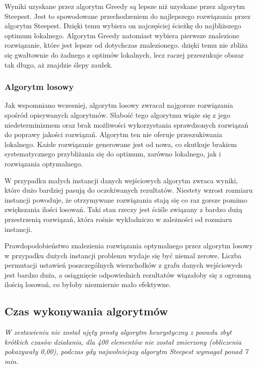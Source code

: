 Wyniki uzyskane przez algorytm Greedy są lepsze niż uzyskane przez algorytm Steepest. 
Jest to spowodowane przechodzeniem do najlepszego rozwiązania przez algorytm Steepest. 
Dzięki temu wybiera on najczęściej ścieżkę do najbliższego optimum lokalnego. Algorytm
Greedy natomiast wybiera pierwsze znalezione rozwiązanie, które jest lepsze od dotychczas 
znalezionego. dzięki temu nie zbliża się gwałtownie do żadnego z optimów lokalnych, lecz 
raczej przeszukuje obszar tak długo, aż znajdzie ślepy zaułek.


\subsubsection{Algorytm losowy}

Jak wspomniano wczesniej, algorytm losowy zwracał najgorsze rozwiązania spośród
opisywanych algorytmów. Słabość tego algorytmu wiąże się z jego niedeterminizmem
oraz brak możliwości wykorzystania sprawdzonych rozwiązań do poprawy jakości
rozwiązań. Algorytm ten nie oferuje przeszukiwania lokalnego. Każde rozwiązanie
generowane jest od nowa, co skutkuje brakiem systematycznego przybliżania
się do optimum, zarówno lokalnego, jak i rozwiązania optymalnego.

W przypadku małych instancji danych wejściowych algorytm zwraca wyniki, które
dużo bardziej pasują do oczekiwanych rezultatów. Niestety wzrost rozmiaru
instancji powoduje, że otrzymywane rozwiązania stają się co raz gorsze
pomimo zwiększania ilości losowań. Taki stan rzeczy jest ściśle
związany z bardzo dużą przestrzenią rozwiązań, która rośnie wykładniczo
w zależności od rozmiaru instancji.

Prawdopodobieństwo znalezienia rozwiązania optymalnego przez algorytm
losowy w przypadku dużych instancji problemu wydaje się
być niemal zerowe. Liczba permutacji ustawień poszczególnych wierzchołków
z grafu danych wejściowych jest bardzo duża, a osiągnięcie odpowiednich
rezultatów wiązałoby się z ogromną ilością losowań, co byłoby niezmiernie
mało efektywne.

\subsection{Czas wykonywania algorytmów}

\it
W zestawieniu nie został ujęty prosty algorytm heurystyczny z poowdu zbyt krótkich czasów 
działania, dla 400 elementów nie został zmierzony (obliczenia pokazywały 0,00), podczas 
gdy najwolniejszy algorytm Steepest wymagał ponad 7 min.
\rm

